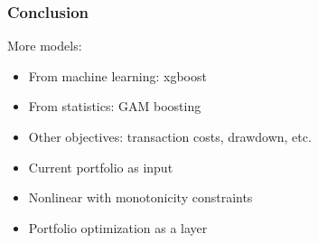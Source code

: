\documentclass[a4paper,12pt,compress,serif]{beamer}
\begin{document}
\begin{frame}
  \frametitle{Conclusion}
  More models:
  \begin{itemize}
  \item From machine learning: xgboost
  \item From statistics: GAM boosting
  \item Other objectives: transaction costs, drawdown, etc.
  \item Current portfolio as input
  \item Nonlinear with monotonicity constraints
  \item Portfolio optimization as a layer
  \end{itemize}
\end{frame}
\end{document}
